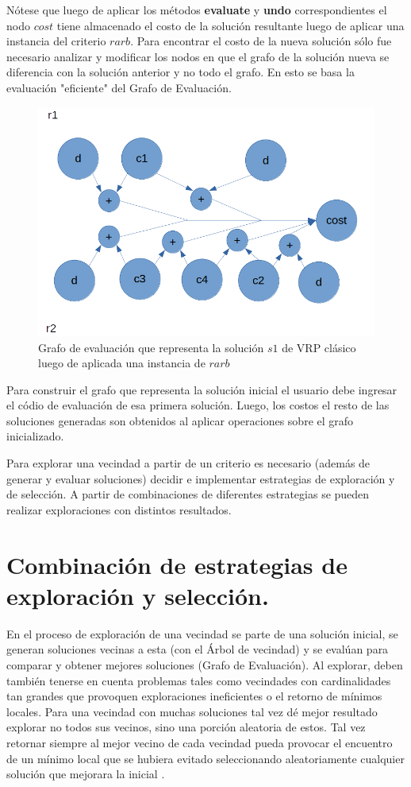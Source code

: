 Nótese que luego de aplicar los métodos \textbf{evaluate} y \textbf{undo} correspondientes el nodo $cost$ tiene almacenado el costo de la solución resultante luego de aplicar una instancia del criterio $rarb$. Para encontrar el costo de la nueva solución sólo fue necesario analizar y modificar los nodos en que el grafo de la solución nueva se diferencia con la solución anterior y no todo el grafo. En esto se basa la evaluación "eficiente" del Grafo de Evaluación.

\begin{figure}
	\centering
	\includegraphics[width=0.9\linewidth]{Graphics/eval-graph-4}
	\caption{Grafo de evaluación que representa la solución $s1$ de VRP clásico luego de aplicada una instancia de $rarb$}
	\label{fig:eval-graph-4}
\end{figure}

Para construir el grafo que representa la solución inicial el usuario debe ingresar el códio de evaluación de esa primera solución. Luego, los costos el resto de las soluciones generadas son obtenidos al aplicar operaciones sobre el grafo inicializado.

Para explorar una vecindad a partir de un criterio es necesario (además de generar y evaluar soluciones) decidir e implementar estrategias de exploración y de selección. A partir de combinaciones de diferentes estrategias se pueden realizar exploraciones con distintos resultados.


\section{Combinación de estrategias de exploración y selección.}\label{2-Heidy}
En el proceso de exploración de una vecindad se parte de una solución inicial, se generan soluciones vecinas a esta (con el Árbol de vecindad) y se evalúan para comparar y obtener mejores soluciones (Grafo de Evaluación). Al explorar, deben también tenerse en cuenta problemas tales como vecindades con cardinalidades tan grandes que provoquen exploraciones ineficientes o el retorno de mínimos locales\cite{TODO}. Para una vecindad con muchas soluciones tal vez dé mejor resultado explorar no todos sus vecinos, sino una porción aleatoria de estos. Tal vez retornar siempre al mejor vecino de cada vecindad pueda provocar el encuentro de un mínimo local que se hubiera evitado seleccionando aleatoriamente cualquier solución que mejorara la inicial \cite{TODO}.

